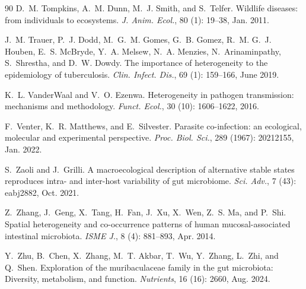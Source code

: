 \documentclass[oneside, a4paper, onecolumn, 11pt]{article}
\begin{document}
\begin{thebibliography}{90}
D.~M. Tompkins, A.~M. Dunn, M.~J. Smith, and S.~Telfer.
\newblock Wildlife diseases: from individuals to ecosystems.
\newblock \emph{J. Anim. Ecol.}, 80 (1): 19--38, Jan. 2011.

J.~M. Trauer, P.~J. Dodd, M.~G.~M. Gomes, G.~B. Gomez, R.~M. G.~J. Houben, E.~S. McBryde, Y.~A. Melsew, N.~A. Menzies, N.~Arinaminpathy, S.~Shrestha, and D.~W. Dowdy.
\newblock The importance of heterogeneity to the epidemiology of tuberculosis.
\newblock \emph{Clin. Infect. Dis.}, 69 (1): 159--166, June 2019.

K.~L. VanderWaal and V.~O. Ezenwa.
\newblock Heterogeneity in pathogen transmission: mechanisms and methodology.
\newblock \emph{Funct. Ecol.}, 30 (10): 1606--1622, 2016.

F.~Venter, K.~R. Matthews, and E.~Silvester.
\newblock Parasite co-infection: an ecological, molecular and experimental perspective.
\newblock \emph{Proc. Biol. Sci.}, 289 (1967): 20212155, Jan. 2022.

S.~Zaoli and J.~Grilli.
\newblock A macroecological description of alternative stable states reproduces intra- and inter-host variability of gut microbiome.
\newblock \emph{Sci. Adv.}, 7 (43): eabj2882, Oct. 2021.

Z.~Zhang, J.~Geng, X.~Tang, H.~Fan, J.~Xu, X.~Wen, Z.~S. Ma, and P.~Shi.
\newblock Spatial heterogeneity and co-occurrence patterns of human mucosal-associated intestinal microbiota.
\newblock \emph{ISME J.}, 8 (4): 881--893, Apr. 2014.

Y.~Zhu, B.~Chen, X.~Zhang, M.~T. Akbar, T.~Wu, Y.~Zhang, L.~Zhi, and Q.~Shen.
\newblock Exploration of the muribaculaceae family in the gut microbiota: Diversity, metabolism, and function.
\newblock \emph{Nutrients}, 16 (16): 2660, Aug. 2024.

\end{thebibliography}
\end{document}
